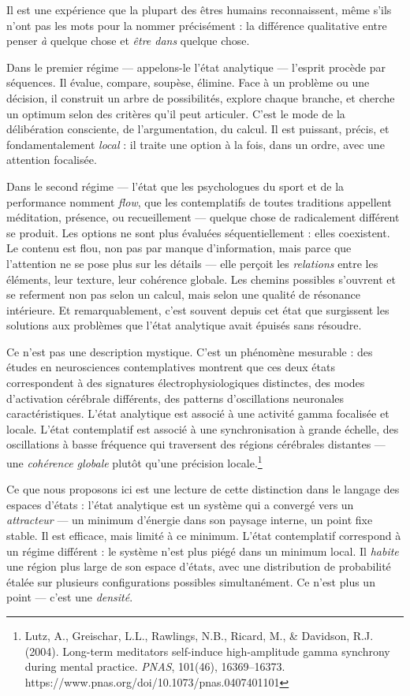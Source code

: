 \documentclass[french, 11pt, twoside, openright, a5paper]{book}
\begin{document}
Il est une expérience que la plupart des êtres humains reconnaissent,
même s'ils n'ont pas les mots pour la nommer précisément : la différence
qualitative entre penser \emph{à} quelque chose et \emph{être dans}
quelque chose.

Dans le premier régime --- appelons-le l'état analytique --- l'esprit
procède par séquences. Il évalue, compare, soupèse, élimine. Face à un
problème ou une décision, il construit un arbre de possibilités, explore
chaque branche, et cherche un optimum selon des critères qu'il peut
articuler. C'est le mode de la délibération consciente, de
l'argumentation, du calcul. Il est puissant, précis, et fondamentalement
\emph{local} : il traite une option à la fois, dans un ordre, avec une
attention focalisée.

Dans le second régime --- l'état que les psychologues du sport et de la
performance nomment \emph{flow}, que les contemplatifs de toutes
traditions appellent méditation, présence, ou recueillement --- quelque
chose de radicalement différent se produit. Les options ne sont plus
évaluées séquentiellement : elles coexistent. Le contenu est flou, non
pas par manque d'information, mais parce que l'attention ne se pose plus
sur les détails --- elle perçoit les \emph{relations} entre les
éléments, leur texture, leur cohérence globale. Les chemins possibles
s'ouvrent et se referment non pas selon un calcul, mais selon une
qualité de résonance intérieure. Et remarquablement, c'est souvent
depuis cet état que surgissent les solutions aux problèmes que l'état
analytique avait épuisés sans résoudre.

Ce n'est pas une description mystique. C'est un phénomène mesurable :
des études en neurosciences contemplatives montrent que ces deux états
correspondent à des signatures électrophysiologiques distinctes, des
modes d'activation cérébrale différents, des patterns d'oscillations
neuronales caractéristiques. L'état analytique est associé à une
activité gamma focalisée et locale. L'état contemplatif est associé à
une synchronisation à grande échelle, des oscillations à basse fréquence
qui traversent des régions cérébrales distantes --- une \emph{cohérence
globale} plutôt qu'une précision locale.\footnote{Lutz, A., Greischar, L.L., Rawlings, N.B., Ricard, M., \& Davidson, R.J. (2004). Long-term meditators self-induce high-amplitude gamma synchrony during mental practice. \emph{PNAS}, 101(46), 16369--16373. https://www.pnas.org/doi/10.1073/pnas.0407401101}

Ce que nous proposons ici est une lecture de cette distinction dans le
langage des espaces d'états : l'état analytique est un système qui a
convergé vers un \emph{attracteur} --- un minimum d'énergie dans son
paysage interne, un point fixe stable. Il est efficace, mais limité à ce
minimum. L'état contemplatif correspond à un régime différent : le
système n'est plus piégé dans un minimum local. Il \emph{habite} une
région plus large de son espace d'états, avec une distribution de
probabilité étalée sur plusieurs configurations possibles simultanément.
Ce n'est plus un point --- c'est une \emph{densité}.
\end{document}
